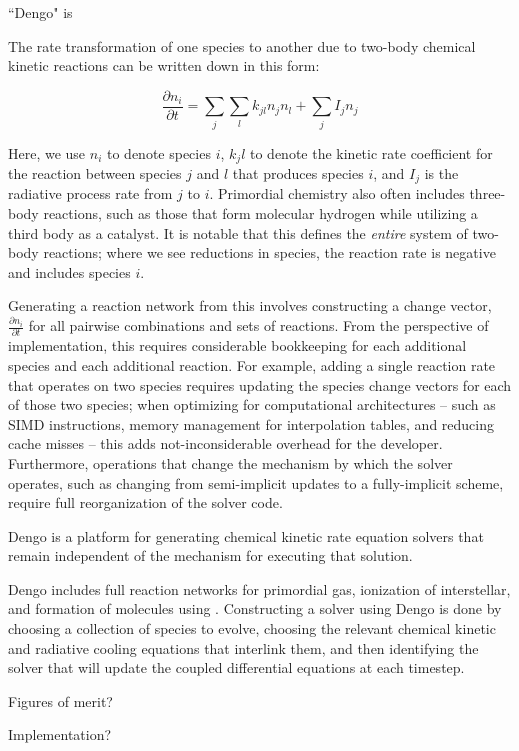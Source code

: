 ``Dengo" is 



The rate transformation of one species to another due to two-body chemical kinetic
reactions can be written down in this form:

$$
\frac{\partial n_i }{\partial t} = \sum_{j}\sum_{l} k_{jl}n_{j}n_{l} + \sum_{j}I_{j}n_{j}
$$

Here, we use $n_{i}$ to denote species $i$, ${k_jl}$ to denote the kinetic rate
coefficient for the reaction between species $j$ and $l$ that produces species
$i$, and $I_{j}$ is the radiative process rate from $j$ to $i$.  Primordial
chemistry also often includes three-body reactions, such as those that
form molecular hydrogen while utilizing a third body as a catalyst.  It is
notable that this defines the \textit{entire} system of two-body reactions;
where we see reductions in species, the reaction rate is negative and includes
species ${i}$.


Generating a reaction network from this involves constructing a change vector,
$\frac{\partial n_i}{\partial t}$ for all pairwise combinations and sets of
reactions.  From the perspective of implementation, this requires considerable
bookkeeping for each additional species and each additional reaction.  For
example, adding a single reaction rate that operates on two species requires
updating the species change vectors for each of those two species; when
optimizing for computational architectures -- such as SIMD instructions, memory
management for interpolation tables, and reducing cache misses -- this adds
not-inconsiderable overhead for the developer.  Furthermore, operations that
change the mechanism by which the solver operates, such as changing from
semi-implicit updates to a fully-implicit scheme, require full reorganization
of the solver code.

Dengo is a platform for generating chemical kinetic rate equation solvers that
remain independent of the mechanism for executing that solution.


Dengo includes full reaction networks for primordial gas, ionization of
interstellar, and formation of molecules using .  Constructing a
solver using Dengo is done by choosing a collection of species to evolve,
choosing the relevant chemical kinetic and radiative cooling equations that
interlink them, and then identifying the solver that will update the coupled
differential equations at each timestep.



Figures of merit?

Implementation?
